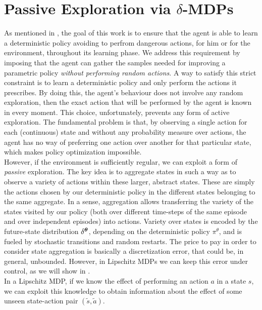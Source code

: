 \section{Passive Exploration via $\delta$-MDPs}\label{sec:deltamdp}
As mentioned in , the goal of this work is to ensure that the agent is able to learn a deterministic policy avoiding to perfrom dangerous actions, for him or for the environment, throughout its learning phase. We address this requirement by imposing that the agent can gather the samples needed for improving a parametric policy \emph{without performing random actions}. A way to satisfy this strict constraint is to learn a deterministic policy and only perform the actions it prescribes. By doing this, the agent's behaviour does not involve any random exploration, then the exact action that will be performed by the agent is known in every moment. 
This choice, unfortunately, prevents any form of active exploration. The fundamental problem is that, by observing a single action for each (continuous) state and without any probability measure over actions, the agent has no way of preferring one action over another for that particular state, which makes policy optimization impossible.\\
\newline 
However, if the environment is sufficiently regular, we can exploit a form of \emph{passive} exploration. 
The key idea is to aggregate states in such a way as to observe a variety of actions within these larger, abstract states. These are simply the actions chosen by our deterministic policy in the different states belonging to the same aggregate. In a sense, aggregation allows transferring the variety of the states visited by our policy (both over different time-steps of the same episode and over independent episodes) into actions. Variety over states is encoded by the future-state distribution $\delta^{\boldsymbol{\theta}}$, depending on the deterministic policy $\pi^{\theta}$, and is fueled by stochastic transitions and random restarts.
The price to pay in order to consider state aggregation is basically a discretization error, that could be, in general, unbounded. However, in Lipschitz MDPs we can keep this error under control, as we will show in .\\
\newline
In a Lipschitz \ac{MDP}, if we know the effect of performing an action $a$ in a state $s$, we can exploit this knowledge to obtain information about the effect of some unseen state-action pair $(\widetilde{s}, \widetilde{a})$.
